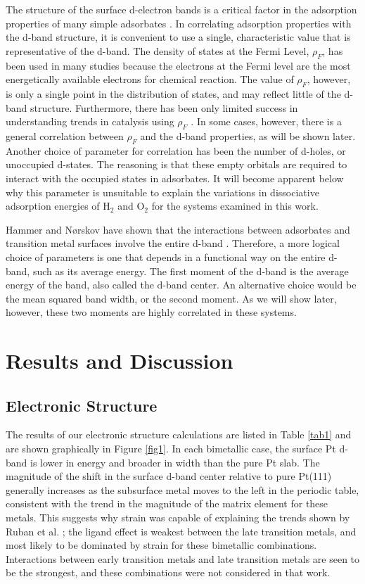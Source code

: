 \documentclass[aps,preprint,superscriptaddress,endfloats*]{revtex4}
\begin{document}
The structure of the surface d-electron bands is a critical factor in
the adsorption properties of many simple adsorbates
\cite{hammer2000:_adv_cat}.  In correlating adsorption properties with
the d-band structure, it is convenient to use a single, characteristic
value that is representative of the d-band.  The density of states at
the Fermi Level, $\rho_F$, has been used in many studies because the
electrons at the Fermi level are the most energetically available
electrons for chemical reaction. The value of $\rho_F$, however, is
only a single point in the distribution of states, and may reflect
little of the d-band structure.  Furthermore, there has been only
limited success in understanding trends in catalysis using $\rho_F$
\cite[Ch. 2]{vansanten1991}.  In some cases, however, there is a
general correlation between $\rho_F$ and the d-band properties, as
will be shown later.  Another choice of parameter for correlation has
been the number of d-holes, or unoccupied d-states.  The reasoning is
that these empty orbitals are required to interact with the occupied
states in adsorbates.  It will become apparent below why this
parameter is unsuitable to explain the variations in dissociative
adsorption energies of H$_2$ and O$_2$ for the systems examined in
this work.

Hammer and N{\o}rskov have shown that the interactions between
adsorbates and transition metal surfaces involve the entire d-band
\cite{hammer2000:_adv_cat}.  Therefore, a more logical choice of
parameters is one that depends in a functional way on the entire
d-band, such as its average energy.  The first moment of the d-band is
the average energy of the band, also called the d-band center.  An
alternative choice would be the mean squared band width, or the second
moment.  As we will show later, however, these two moments are highly
correlated in these systems.

\section{Results and Discussion}
\subsection{Electronic Structure}
The results of our electronic structure calculations are listed in
Table \ref{tab1} and are shown graphically in Figure \ref{fig1}.  In
each bimetallic case, the surface Pt d-band is lower in energy and
broader in width than the pure Pt slab.  The magnitude of the shift in
the surface d-band center relative to pure Pt(111) generally increases as the
subsurface metal moves to the left in the periodic table, consistent
with the trend in the magnitude of the matrix element \cite{ruban1997:_surfac} for
these metals.  This suggests why strain was capable of explaining
the trends shown by Ruban et al. \cite{ruban1997:_surfac}; the ligand effect is
weakest between the late transition metals, and most likely to be
dominated by strain for these bimetallic combinations.  Interactions
between early transition metals and late transition metals are seen to
be the strongest, and these combinations were not considered in that
work.
  
\end{document}
